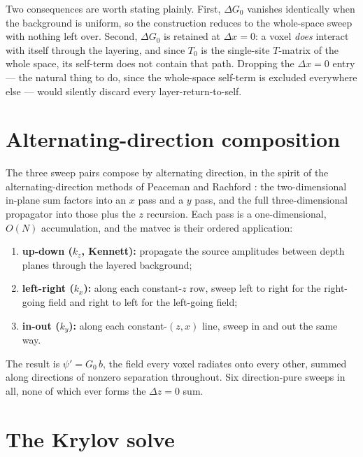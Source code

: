 \documentclass[11pt,a4paper]{article}
\newcommand{\Tz}{T_0}
\newcommand{\Gz}{G_0}
\begin{document}
Two consequences are worth stating plainly. First, $\Delta\Gz$ vanishes identically when the
background is uniform, so the construction reduces to the whole-space sweep with nothing left
over. Second, $\Delta\Gz$ is retained at $\Delta x = 0$: a voxel \emph{does} interact with
itself through the layering, and since $\Tz$ is the single-site $T$-matrix of the whole space,
its self-term does not contain that path. Dropping the $\Delta x=0$ entry --- the natural thing
to do, since the whole-space self-term is excluded everywhere else --- would silently discard
every layer-return-to-self.

\section{Alternating-direction composition}

The three sweep pairs compose by alternating direction, in the spirit of the
alternating-direction methods of Peaceman and Rachford \cite{PeacemanRachford1955}: the
two-dimensional in-plane sum factors into an $x$ pass and a $y$ pass, and the full
three-dimensional propagator into those plus the $z$ recursion. Each pass is a
one-dimensional, $O(N)$ accumulation, and the matvec is their ordered application:
\begin{enumerate}\setlength{\itemsep}{1pt}
\item \textbf{up-down ($k_z$, Kennett):} propagate the source amplitudes between depth planes
through the layered background;
\item \textbf{left-right ($k_x$):} along each constant-$z$ row, sweep left to right for the
right-going field and right to left for the left-going field;
\item \textbf{in-out ($k_y$):} along each constant-$(z,x)$ line, sweep in and out the same way.
\end{enumerate}
The result is $\psi'=\Gz\,b$, the field every voxel radiates onto every other, summed along
directions of nonzero separation throughout. Six direction-pure sweeps in all, none of which
ever forms the $\Delta z=0$ sum.

\section{The Krylov solve}
\end{document}
